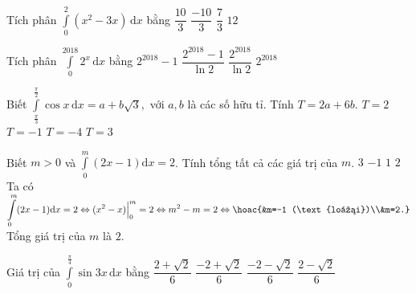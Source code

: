 \begin{ex}%
	Tích phân $\displaystyle\int\limits_0^2 \left(x^2-3x \right)\mathrm{\,d}x$ bằng
	\choice
	{$\dfrac{10}{3}$}
	{\True $\dfrac{-10}{3}$}
	{$\dfrac{7}{3}$}
	{$12$}
\end{ex}


\begin{ex}%
	Tích phân $\displaystyle\int\limits_0^{2018}{2^x\mathrm{\,d}x}$ bằng
	\choice
	{$2^{2018}-1$}
	{\True $\dfrac{2^{2018}-1}{\ln 2}$}
	{$\dfrac{2^{2018}}{\ln 2}$}
	{$2^{2018}$}
\end{ex}

\begin{ex}%
	Biết $ \displaystyle\int\limits_{\tfrac{\pi}{3}}^{\tfrac{\pi}{2}}\cos x \mathrm{\, d}x=a+b\sqrt{3}, $ với $ a, b $ là các số hữu tỉ. Tính $ T=2a+6b. $
	\choice
	{$ T=2 $}
	{\True $ T=-1 $}
	{$ T=-4 $}
	{$ T=3 $}
\end{ex}

\begin{ex}%
	Biết $m>0$ và $\displaystyle \int \limits_0^m (2x-1) \mathrm{d}x=2$. Tính tổng tất cả các giá trị của $m$.
	\choice
	{$3$}
	{$-1$}
	{$1$}
	{\True $2$}
	\loigiai
	{Ta có $\displaystyle \int \limits_0^m (2x-1)\mathrm{d}x=2 \Leftrightarrow (x^2-x) \Big|_0^m= 2 \Leftrightarrow m^2-m=2 \Leftrightarrow \hoac{&m=-1 (\text{loại})\\&m=2.}$\\
		Tổng giá trị của $m$ là $2$.}
\end{ex}
\begin{ex}%
	Giá trị của $\displaystyle\int\limits_{0}^{\tfrac{\pi}{4}}\sin 3x\mathrm{\,d}x$ bằng
	\choice
	{\True $\dfrac{2+\sqrt{2}}{6}$}
	{$\dfrac{-2+\sqrt{2}}{6}$}
	{$\dfrac{-2-\sqrt{2}}{6}$}
	{$\dfrac{2-\sqrt{2}}{6}$}
\end{ex}

